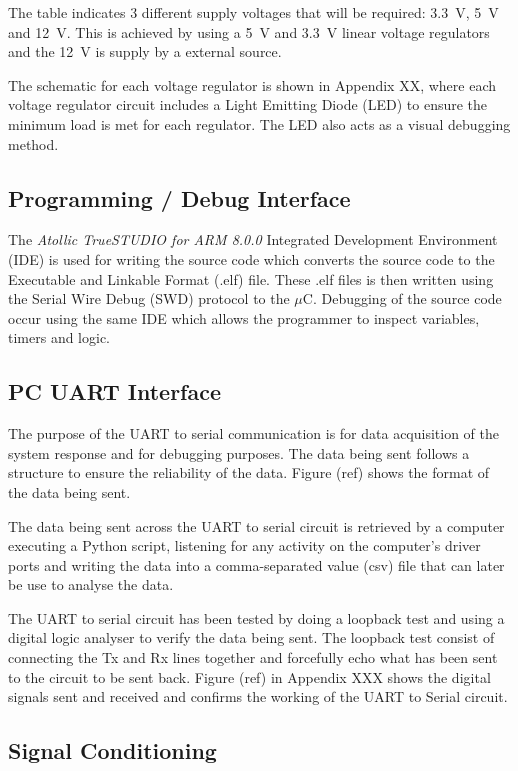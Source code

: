 The table indicates 3 different supply voltages that will be required: \SI{3.3}{V}, \SI{5}{V} and \SI{12}{V}. This is achieved by using a \SI{5}{V} and \SI{3.3}{V} linear voltage regulators and the \SI{12}{V} is supply by a external source.

The schematic for each voltage regulator is shown in Appendix XX, where each voltage regulator circuit includes a Light Emitting Diode (LED) to ensure the minimum load is met for each regulator. The LED also acts as a visual debugging method.

\subsection{Programming / Debug Interface}

The \textit{Atollic TrueSTUDIO for ARM 8.0.0} Integrated Development Environment (IDE) is used for writing the source code which converts the source code to the Executable and Linkable Format (.elf) file. These .elf files is then written using the Serial Wire Debug (SWD) protocol to the $\mu$C. Debugging of the source code occur using the same IDE which allows the programmer to inspect variables, timers and logic.

\subsection{PC UART Interface }

The purpose of the UART to serial communication is for data acquisition of the system response and for debugging purposes. The data being sent follows a structure to ensure the reliability of the data. Figure (ref) shows the format of the data being sent.

The data being sent across the UART to serial circuit is retrieved by a computer executing a Python script, listening for any activity on the computer's driver ports and writing the data into a comma-separated value (csv) file that can later be use to analyse the data.


The UART to serial circuit has been tested by doing a loopback test and using a digital logic analyser to verify the data being sent. The loopback test consist of connecting the Tx and Rx lines together and forcefully echo what has been sent to the circuit to be sent back. Figure (ref) in Appendix XXX shows the digital signals sent and received and confirms the working of the UART to Serial circuit.

\subsection{Signal Conditioning}

